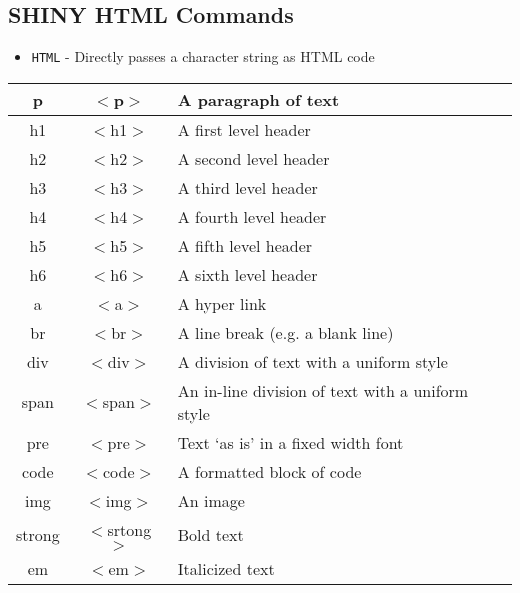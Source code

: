 \documentclass[a4paper,12pt]{article}
\begin{document}
\subsection*{SHINY HTML Commands}
\Large
\begin{itemize}
\item \texttt{HTML}	- Directly passes a character string as HTML code
\end{itemize}


\begin{tabular}{|c|c|l|}
\hline
p	& $<$p$>$ &	A paragraph of text \\ \hline
h1	& $<$h1$>$&	A first level header \\ \hline
h2	& $<$h2$>$&	A second level header\\ \hline
h3	& $<$h3$>$&	A third level header\\ \hline
h4	& $<$h4$>$&	A fourth level header\\ \hline
h5	& $<$h5$>$&	A fifth level header\\ \hline
h6	& $<$h6$>$&	A sixth level header\\ \hline
a	& $<$a$>$&	A hyper link\\ \hline
br	& $<$br$>$&	A line break (e.g. a blank line)\\ \hline
div	& $<$div$>$&	A division of text with a uniform style\\ \hline
span	& $<$span$>$&	An in-line division of text with a uniform style\\ \hline
pre	& $<$pre$>$&	Text ‘as is’ in a fixed width font\\ \hline
code	& $<$code$>$&	A formatted block of code\\ \hline
img	& $<$img$>$&	An image\\ \hline
strong	& $<$srtong$>$&	Bold text\\ \hline
em	& $<$em$>$&	Italicized text\\ \hline
\end{tabular} 
\end{document}
